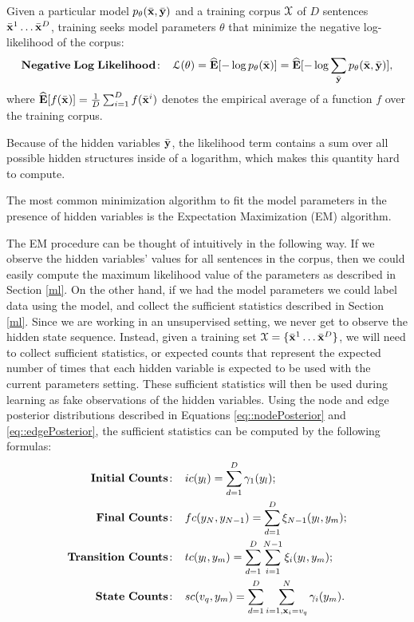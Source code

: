 Given a particular model $p_{\theta}(\bar{\mathbf{x}} ,\bar{\mathbf{y}})$ and a training corpus $\mathcal{X}$ of $D$ sentences $\bar{\mathbf{x}}^1 \ldots \bar{\mathbf{x}}^D$, training 
seeks model parameters $\theta$ that minimize the negative log-likelihood of the corpus:
\begin{equation}
\label{loglikelihoood}
\mathbf{Negative\;Log\;Likelihood\!:}\;\;\;\; \mathcal{L}(\theta) =\mathbf{\widehat{E}} [-\log p_{\theta}(\bar{\mathbf{x}})] = \mathbf{\widehat{E}} [-\log \sum_{\bar{\mathbf{y}}} p_{\theta}(\bar{\mathbf{x}} ,\bar{\mathbf{y}})],
\end{equation}
where $\mathbf{\widehat{E}} [f(\bar{\mathbf{x}})] = \frac{1}{D}\sum_{i=1}^{D} f(\bar{\mathbf{x}}^i)$ denotes the empirical average of a function $f$ over the training corpus.

Because of the hidden variables $\bar{\mathbf{y}}$, the likelihood term contains a
sum over all possible hidden structures inside of a logarithm, which
makes this quantity hard to compute.

The most common minimization
algorithm to fit the model parameters in the presence of hidden
variables is the Expectation Maximization (EM) algorithm. 

The EM procedure can be thought of intuitively in the following way. 
If we observe the hidden variables' values for all sentences in the
corpus, then we could easily compute the maximum likelihood value of
the parameters as described in Section \ref{ml}. 
On the other hand, if we had the model parameters we could label data
using the model, and collect the
sufficient statistics described in Section \ref{ml}.
Since we are working in an unsupervised setting, we never get to
observe the hidden state sequence. Instead, given a 
training set $\mathcal{X} = \{\bar{\mathbf{x}}^1 \ldots \bar{\mathbf{x}}^D\}$, we will need to
collect sufficient statistics, or expected counts that
represent the expected number of times that each hidden variable is
expected to be used with the current parameters setting. These sufficient
statistics will then be used during learning as fake observations of
the hidden variables. Using the node and edge posterior distributions
described in Equations \ref{eq::nodePosterior} and \ref{eq::edgePosterior},
the sufficient statistics can 
be computed by the following formulas:
\begin{align}
\mathbf{Initial \ Counts\!:}\;\;\;\;  &  ic({y}_l) = \sum_{d=1}^D
\gamma_1 ({y}_l); \label{eq::initialCountsPost}\\
\mathbf{Final \ Counts\!:}\;\;\;\;  &  fc({y}_N,{y} _{N-1}) = \sum_{d=1}^D  \xi_{N-1} ({y}_l,{y}_m); \label{eq::finalCountsPost}\\
\mathbf{Transition \ Counts\!:}\;\;\;\;  &  tc({y}_l,{y} _m) = \sum_{d=1}^D \sum_{i = 1}^{N-1}  \xi_i ({y}_l,{y}_m); \label{eq::transitionCountsPost}\\
\mathbf{State \ Counts\!:}\;\;\;\;  &  sc({v}_q,{y}_m) = \sum_{d=1}^D \sum_{i = 1 , \mathbf{x}_i = {v}_q }^{N}  \gamma_i ({y}_m). \label{eq::stateCountsPost}
\end{align}


